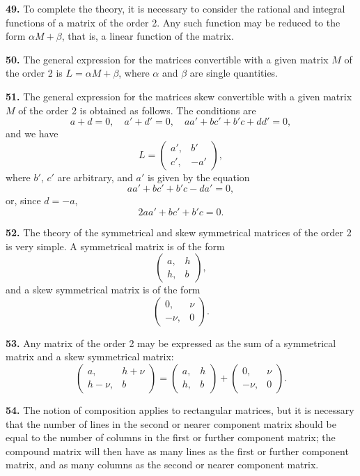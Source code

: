 \documentclass[11pt,a4paper]{book}
\begin{document}
\begin{center}
\medskip
\noindent\textbf{49.} To complete the theory, it is necessary to consider the rational and integral functions of a matrix of the order 2. Any such function may be reduced to the form $\alpha M + \beta$, that is, a linear function of the matrix.

\medskip
\noindent\textbf{50.} The general expression for the matrices convertible with a given matrix $M$ of the order 2 is $L = \alpha M + \beta$, where $\alpha$ and $\beta$ are single quantities.

\medskip
\noindent\textbf{51.} The general expression for the matrices skew convertible with a given matrix $M$ of the order 2 is obtained as follows. The conditions are
\[
a+d=0,\quad a'+d'=0,\quad aa'+bc'+b'c+dd'=0,
\]
and we have
\[
L = \begin{pmatrix} a', & b' \\ c', & -a' \end{pmatrix},
\]
where $b'$, $c'$ are arbitrary, and $a'$ is given by the equation
\[aa' + bc' + b'c - da' = 0,\]
or, since $d=-a$,
\[2aa' + bc' + b'c = 0.\]

\medskip
\noindent\textbf{52.} The theory of the symmetrical and skew symmetrical matrices of the order 2 is very simple. A symmetrical matrix is of the form
\[
\begin{pmatrix} a, & h \\ h, & b \end{pmatrix},
\]
and a skew symmetrical matrix is of the form
\[
\begin{pmatrix} 0, & \nu \\ -\nu, & 0 \end{pmatrix}.
\]

\medskip
\noindent\textbf{53.} Any matrix of the order 2 may be expressed as the sum of a symmetrical matrix and a skew symmetrical matrix:
\[
\begin{pmatrix} a, & h+\nu \\ h-\nu, & b \end{pmatrix}
= \begin{pmatrix} a, & h \\ h, & b \end{pmatrix}
+ \begin{pmatrix} 0, & \nu \\ -\nu, & 0 \end{pmatrix}.
\]

\newpage

\medskip
\noindent\textbf{54.} The notion of composition applies to rectangular matrices, but it is necessary that the number of lines in the second or nearer component matrix should be equal to the number of columns in the first or further component matrix; the compound matrix will then have as many lines as the first or further component matrix, and as many columns as the second or nearer component matrix.


\end{center}
\end{document}
